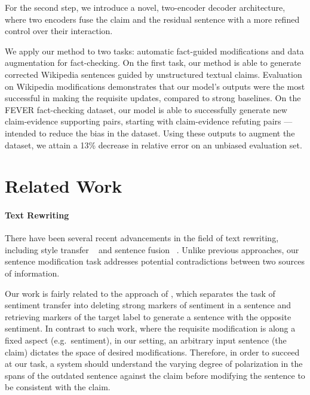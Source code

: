 \documentclass[letterpaper]{article}
\begin{document}
For the second step, we introduce a novel, two-encoder decoder architecture, where two encoders fuse the claim and the residual sentence with a more refined control over their interaction.


We apply our method to two tasks: automatic fact-guided modifications and data augmentation for fact-checking. On the first task, our method is able to generate corrected Wikipedia sentences guided by unstructured textual claims. Evaluation on Wikipedia modifications demonstrates that our model's outputs were the most successful in making the requisite updates, compared to strong baselines. On the FEVER fact-checking dataset, our model is able to successfully generate new claim-evidence supporting pairs, starting with claim-evidence refuting pairs --- intended to reduce the bias in the dataset. Using these outputs to augment the dataset, we attain a 13\% decrease in relative error on an unbiased evaluation set.

















\section{Related Work}
\label{sec:related_work}
\paragraph{Text Rewriting}

There have been several recent advancements in the field of text rewriting, including style transfer
~\cite{shen2017style,zhang2018style,chen-etal-2018-learning} and sentence fusion ~\cite{barzilay2005sentence,narayan-etal-2017-split,geva2019discofuse}. Unlike previous approaches, our sentence modification task addresses potential contradictions between two sources of information.

Our work is fairly related to the approach of \cite{li-etal-2018-delete}, which separates the task of sentiment transfer into deleting strong markers of sentiment in a sentence and retrieving markers of the target label to generate a sentence with the opposite sentiment. In contrast to such work, where the requisite modification is along a fixed aspect (e.g.\ sentiment), in our setting, an arbitrary input sentence (the claim) dictates the space of desired modifications. Therefore, in order to succeed at our task, a system should understand the varying degree of polarization in the spans of the outdated sentence against the claim before modifying the sentence to be consistent with the claim.%
\end{document}
